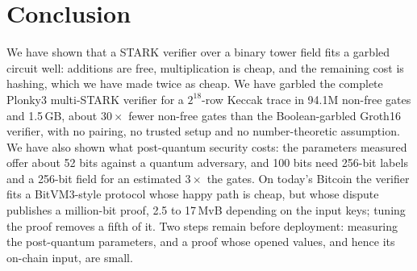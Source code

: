 \documentclass[11pt]{article}
\begin{document}
\section{Conclusion}

We have shown that a STARK verifier over a binary tower field fits a garbled
circuit well: additions are free, multiplication is cheap, and the remaining cost
is hashing, which we have made twice as cheap. We have garbled the complete
Plonky3 multi-STARK verifier for a $2^{18}$-row Keccak trace in 94.1M non-free
gates and 1.5\,GB, about $30\times$ fewer non-free gates than the Boolean-garbled
Groth16 verifier, with no pairing, no trusted setup and no number-theoretic
assumption. We have also shown what post-quantum security costs: the parameters
measured offer about 52 bits against a quantum adversary, and 100 bits need
256-bit labels and a 256-bit field for an estimated $3\times$ the gates. On
today's Bitcoin the verifier fits a BitVM3-style protocol whose happy path is
cheap, but whose dispute publishes a million-bit proof, 2.5 to 17\,MvB depending
on the input keys; tuning the proof removes a fifth of it. Two steps remain before
deployment: measuring the post-quantum parameters, and a proof whose opened
values, and hence its on-chain input, are small.



\end{document}
